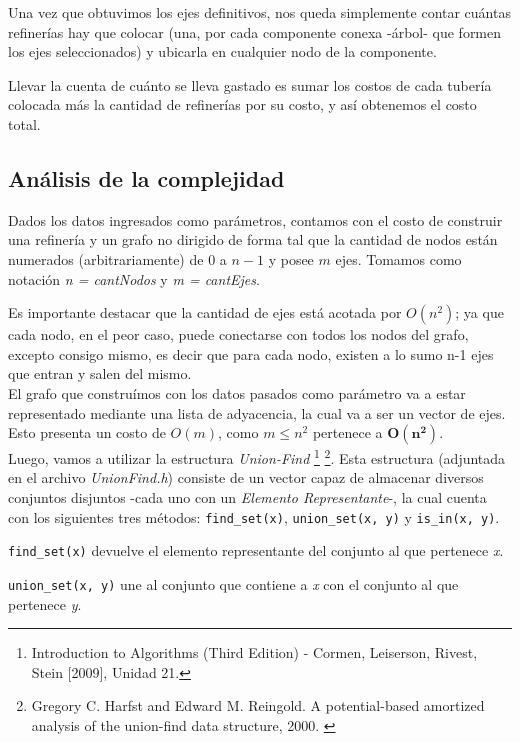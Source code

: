 	Una vez que obtuvimos los ejes definitivos, nos queda simplemente contar cu\'antas refiner\'ias hay que colocar (una, por cada componente conexa -\'arbol- que formen los ejes seleccionados) y ubicarla en cualquier nodo de la componente.
	
	Llevar la cuenta de cu\'anto se lleva gastado es sumar los costos de cada tuber\'ia colocada m\'as la cantidad de refiner\'ias por su costo, y as\'i obtenemos el costo total.


\newpage
\subsection{An\'alisis de la complejidad}

Dados los datos ingresados como par\'ametros, contamos con el costo de construir una refiner\'ia y un grafo no dirigido de forma tal que la cantidad de nodos  est\'an numerados (arbitrariamente) de $0$ a $n-1$ y posee $m$ ejes. Tomamos como notaci\'on \emph{n = cantNodos} y \emph{m = cantEjes}.

Es importante destacar que la cantidad de ejes est\'a acotada por $O(n^2)$; ya que cada nodo, en el peor caso, puede conectarse con todos los nodos del grafo, excepto consigo mismo, es decir que para cada nodo, existen a lo sumo n-1 ejes que entran y salen del mismo.\\

El grafo que constru\'imos con los datos pasados como par\'ametro va a estar representado mediante una lista de adyacencia, la cual va a ser un vector de ejes. Esto presenta un costo de $O(m)$, como $m \leq n^2$ pertenece a $\mathbf{O(n^2)}$.\\

Luego, vamos a utilizar la estructura \emph{Union-Find} \footnote{Introduction to Algorithms (Third Edition) - Cormen, Leiserson, Rivest, Stein [2009], Unidad 21.} \footnote{Gregory C. Harfst and Edward M. Reingold. A potential-based amortized analysis of the
union-find data structure, 2000.	\label{paper}}. Esta estructura (adjuntada en el archivo \textit{UnionFind.h}) consiste de un vector capaz de almacenar diversos conjuntos disjuntos -cada uno con un \emph{Elemento Representante}-, la cual cuenta con los siguientes tres m\'etodos: \texttt{find_set(x)}, \texttt{union_set(x, y)} y \texttt{is_in(x, y)}. 

\texttt{find_set(x)} devuelve el elemento representante del conjunto al que pertenece \emph{x}.

\texttt{union_set(x, y)} une al conjunto que contiene a \emph{x} con el conjunto al que pertenece \emph{y}. 
 

